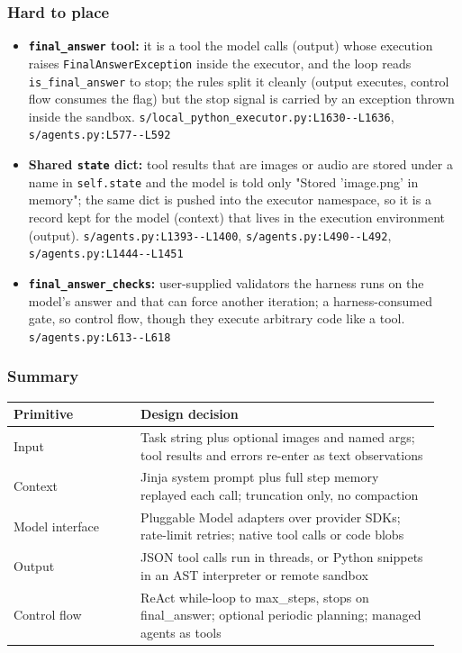 \subsubsection*{Hard to place}
\begin{itemize}
\item \textbf{\texttt{final\_\allowbreak{}answer} tool:} it is a tool the model calls (output) whose execution raises \texttt{FinalAnswerException} inside the executor, and the loop reads \texttt{is\_\allowbreak{}final\_\allowbreak{}answer} to stop; the rules split it cleanly (output executes, control flow consumes the flag) but the stop signal is carried by an exception thrown inside the sandbox. \texttt{s/\allowbreak{}local\_\allowbreak{}python\_\allowbreak{}executor.\allowbreak{}py:\allowbreak{}L1630-\allowbreak{}-\allowbreak{}L1636}, \texttt{s/\allowbreak{}agents.\allowbreak{}py:\allowbreak{}L577-\allowbreak{}-\allowbreak{}L592}
\item \textbf{Shared \texttt{state} dict:} tool results that are images or audio are stored under a name in \texttt{self.\allowbreak{}state} and the model is told only "Stored 'image.png' in memory"; the same dict is pushed into the executor namespace, so it is a record kept for the model (context) that lives in the execution environment (output). \texttt{s/\allowbreak{}agents.\allowbreak{}py:\allowbreak{}L1393-\allowbreak{}-\allowbreak{}L1400}, \texttt{s/\allowbreak{}agents.\allowbreak{}py:\allowbreak{}L490-\allowbreak{}-\allowbreak{}L492}, \texttt{s/\allowbreak{}agents.\allowbreak{}py:\allowbreak{}L1444-\allowbreak{}-\allowbreak{}L1451}
\item \textbf{\texttt{final\_\allowbreak{}answer\_\allowbreak{}checks}:} user-supplied validators the harness runs on the model's answer and that can force another iteration; a harness-consumed gate, so control flow, though they execute arbitrary code like a tool. \texttt{s/\allowbreak{}agents.\allowbreak{}py:\allowbreak{}L613-\allowbreak{}-\allowbreak{}L618}
\end{itemize}

\subsubsection*{Summary}
\begin{longtable}{@{}p{0.28\linewidth}p{0.66\linewidth}@{}}
\toprule \textbf{Primitive} & \textbf{Design decision} \\ \midrule \endhead
Input & Task string plus optional images and named args; tool results and errors re-enter as text observations \\
Context & Jinja system prompt plus full step memory replayed each call; truncation only, no compaction \\
Model interface & Pluggable Model adapters over provider SDKs; rate-limit retries; native tool calls or code blobs \\
Output & JSON tool calls run in threads, or Python snippets in an AST interpreter or remote sandbox \\
Control flow & ReAct while-loop to max\_steps, stops on final\_answer; optional periodic planning; managed agents as tools \\
\bottomrule \end{longtable}


